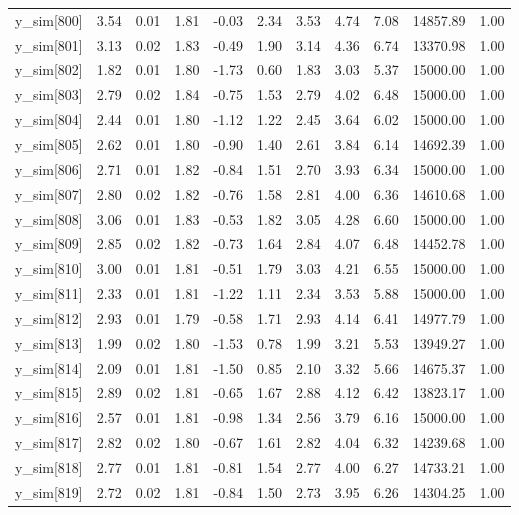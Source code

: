 \begin{table}[ht]
\begin{tabular}{rrrrrrrrrrr}
  y\_sim[800] & 3.54 & 0.01 & 1.81 & -0.03 & 2.34 & 3.53 & 4.74 & 7.08 & 14857.89 & 1.00 \\ 
  y\_sim[801] & 3.13 & 0.02 & 1.83 & -0.49 & 1.90 & 3.14 & 4.36 & 6.74 & 13370.98 & 1.00 \\ 
  y\_sim[802] & 1.82 & 0.01 & 1.80 & -1.73 & 0.60 & 1.83 & 3.03 & 5.37 & 15000.00 & 1.00 \\ 
  y\_sim[803] & 2.79 & 0.02 & 1.84 & -0.75 & 1.53 & 2.79 & 4.02 & 6.48 & 15000.00 & 1.00 \\ 
  y\_sim[804] & 2.44 & 0.01 & 1.80 & -1.12 & 1.22 & 2.45 & 3.64 & 6.02 & 15000.00 & 1.00 \\ 
  y\_sim[805] & 2.62 & 0.01 & 1.80 & -0.90 & 1.40 & 2.61 & 3.84 & 6.14 & 14692.39 & 1.00 \\ 
  y\_sim[806] & 2.71 & 0.01 & 1.82 & -0.84 & 1.51 & 2.70 & 3.93 & 6.34 & 15000.00 & 1.00 \\ 
  y\_sim[807] & 2.80 & 0.02 & 1.82 & -0.76 & 1.58 & 2.81 & 4.00 & 6.36 & 14610.68 & 1.00 \\ 
  y\_sim[808] & 3.06 & 0.01 & 1.83 & -0.53 & 1.82 & 3.05 & 4.28 & 6.60 & 15000.00 & 1.00 \\ 
  y\_sim[809] & 2.85 & 0.02 & 1.82 & -0.73 & 1.64 & 2.84 & 4.07 & 6.48 & 14452.78 & 1.00 \\ 
  y\_sim[810] & 3.00 & 0.01 & 1.81 & -0.51 & 1.79 & 3.03 & 4.21 & 6.55 & 15000.00 & 1.00 \\ 
  y\_sim[811] & 2.33 & 0.01 & 1.81 & -1.22 & 1.11 & 2.34 & 3.53 & 5.88 & 15000.00 & 1.00 \\ 
  y\_sim[812] & 2.93 & 0.01 & 1.79 & -0.58 & 1.71 & 2.93 & 4.14 & 6.41 & 14977.79 & 1.00 \\ 
  y\_sim[813] & 1.99 & 0.02 & 1.80 & -1.53 & 0.78 & 1.99 & 3.21 & 5.53 & 13949.27 & 1.00 \\ 
  y\_sim[814] & 2.09 & 0.01 & 1.81 & -1.50 & 0.85 & 2.10 & 3.32 & 5.66 & 14675.37 & 1.00 \\ 
  y\_sim[815] & 2.89 & 0.02 & 1.81 & -0.65 & 1.67 & 2.88 & 4.12 & 6.42 & 13823.17 & 1.00 \\ 
  y\_sim[816] & 2.57 & 0.01 & 1.81 & -0.98 & 1.34 & 2.56 & 3.79 & 6.16 & 15000.00 & 1.00 \\ 
  y\_sim[817] & 2.82 & 0.02 & 1.80 & -0.67 & 1.61 & 2.82 & 4.04 & 6.32 & 14239.68 & 1.00 \\ 
  y\_sim[818] & 2.77 & 0.01 & 1.81 & -0.81 & 1.54 & 2.77 & 4.00 & 6.27 & 14733.21 & 1.00 \\ 
  y\_sim[819] & 2.72 & 0.02 & 1.81 & -0.84 & 1.50 & 2.73 & 3.95 & 6.26 & 14304.25 & 1.00 \\ 

\end{tabular}
\end{table}
